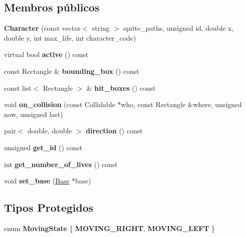 \subsection*{Membros públicos}
\begin{DoxyCompactItemize}
\item 
\mbox{\label{classCharacter_a442a1c3c8e82823ef340f078c8f4bb50}} 
{\bfseries Character} (const vector$<$ string $>$ sprite\+\_\+paths, unsigned id, double x, double y, int max\+\_\+life, int character\+\_\+code)
\item 
\mbox{\label{classCharacter_adbe9684ed82ce4b053881c1a31f2aa97}} 
virtual bool {\bfseries active} () const
\item 
\mbox{\label{classCharacter_a73c09996272b771f375a9514d0c465f1}} 
const Rectangle \& {\bfseries bounding\+\_\+box} () const
\item 
\mbox{\label{classCharacter_acb89adb702cac9caca3178066f642443}} 
const list$<$ Rectangle $>$ \& {\bfseries hit\+\_\+boxes} () const
\item 
\mbox{\label{classCharacter_a9559ad61239800e744931814826ae39b}} 
void {\bfseries on\+\_\+collision} (const Collidable $\ast$who, const Rectangle \&where, unsigned now, unsigned last)
\item 
\mbox{\label{classCharacter_a41e5ac6f8f3b9a15d78dd92de89768af}} 
pair$<$ double, double $>$ {\bfseries direction} () const
\item 
\mbox{\label{classCharacter_af5a0058d7cc922c1045f304b480a211c}} 
unsigned {\bfseries get\+\_\+id} () const
\item 
\mbox{\label{classCharacter_ad3fc9bf9dc3667f9d01b05f5e1940ae6}} 
int {\bfseries get\+\_\+number\+\_\+of\+\_\+lives} () const
\item 
\mbox{\label{classCharacter_a4cb413b53515a09d025fa0b3fe5a4e9f}} 
void {\bfseries set\+\_\+base} (\mbox{\hyperlink{classBase}{Base}} $\ast$base)
\end{DoxyCompactItemize}
\subsection*{Tipos Protegidos}
\begin{DoxyCompactItemize}
\item 
\mbox{\label{classCharacter_afbe3b1ceb8e8463b3b66964080149c30}} 
enum {\bfseries Moving\+State} \{ {\bfseries M\+O\+V\+I\+N\+G\+\_\+\+R\+I\+G\+HT}, 
{\bfseries M\+O\+V\+I\+N\+G\+\_\+\+L\+E\+FT}
 \}
\end{DoxyCompactItemize}
